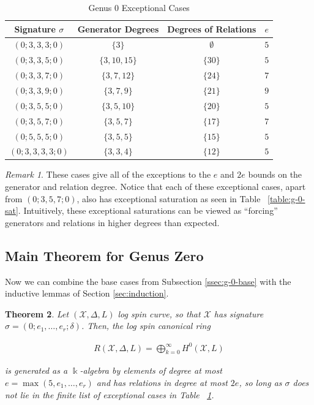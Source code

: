 \documentclass{amsart}
\theoremstyle{plain}
\newtheorem{thm}{Theorem}[section]
\theoremstyle{definition}
\theoremstyle{remark}
\newtheorem{rem}[thm]{Remark}
\numberwithin{equation}{section}
\newcommand\ssec{\subsection}
\newcommand\Bk{{\Bbbk}}
\newcommand\sx{\mathscr X}
\newcommand{\halfcan}{L}
\begin{document}
\begin{table}
\begin{tabular}
	{| c || c | c | c |}
	\hline
	Signature $\sigma$ & Generator Degrees & Degrees of Relations & $e$ \\
	\hline
	\hline

	$(0; 3, 3, 3; 0)$ & $\{3\}$ & $\emptyset$ & $5$ \\	\hline

	$(0; 3, 3, 5; 0)$ & $\{3, 10, 15\}$ & $\{30\}$ & $5$ \\	\hline
	
	$(0; 3, 3, 7; 0)$ & $\{3, 7, 12\}$ & $\{24\}$ & $7$ \\	\hline
	
	$(0; 3, 3, 9; 0)$ & $\{3, 7, 9\}$ & $\{21\}$ & $9$ \\	\hline
	
	$(0; 3, 5, 5; 0)$ & $\{3, 5, 10\}$ & $\{20\}$ & $5$ \\	\hline
	
	$(0; 3, 5, 7; 0)$ & $\{3, 5, 7\}$ & $\{17\}$ & $7$ \\	\hline
	
	$(0; 5, 5, 5; 0)$ & $\{3, 5, 5\}$ & $\{15\}$ & $5$ \\	\hline
	
	$(0; 3, 3, 3, 3; 0)$ & $\{3, 3, 4\}$ & $\{12\}$ & $5$ \\	\hline
\end{tabular}

\caption{Genus 0 Exceptional Cases}
\label{table:g-0-exceptional}
\end{table}

\begin{rem}
These cases give all of the exceptions to the $e$ and $2e$ bounds
on the generator and relation degree. Notice that each of these
exceptional cases, apart from $(0; 3, 5, 7; 0)$, also has
exceptional saturation as seen in Table ~\ref{table:g-0-sat}.
Intuitively, these exceptional saturations can be viewed as
``forcing'' generators and relations in higher degrees than expected.
\end{rem}

\ssec{Main Theorem for Genus Zero}
\label{ssec:g-0-main}
Now we can combine the base cases from Subsection \ref{ssec:g-0-base} with the inductive lemmas of Section \ref{sec:induction}.

\begin{thm}
\label{thm:g-0-main}
Let $(\sx, \Delta, \halfcan)$ log spin curve,
so that $\sx$ has signature $\sigma = (0; e_1, \ldots, e_r; \delta)$.
Then, the log spin canonical ring

\begin{align*}
	R(\sx, \Delta, \halfcan) = \bigoplus_{k = 0}^\infty H^0(\sx, L)
\end{align*}

\noindent
is generated as a $\Bk$-algebra by elements of degree at most $e =
\max(5, e_1, \ldots, e_r)$ and has relations in degree at most $2e$,
so long as $\sigma$ does not lie in the finite list of exceptional
cases in Table ~\ref{table:g-0-exceptional}.
\end{thm}
\end{document}
